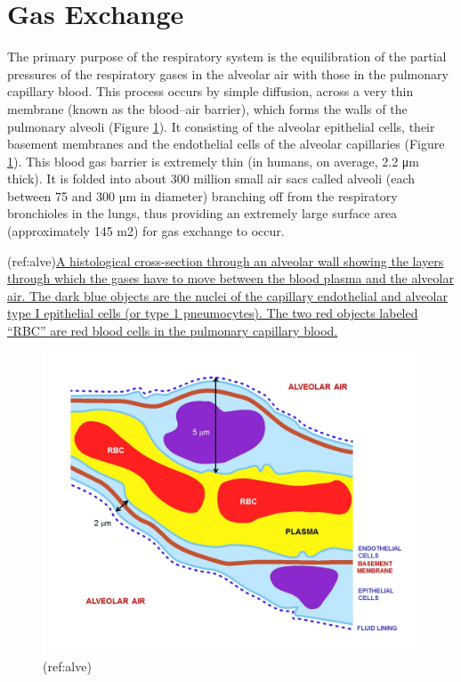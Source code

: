 \hypertarget{gas-exchange}{%
\section{Gas Exchange}\label{gas-exchange}}

The primary purpose of the respiratory system is the equilibration of the partial pressures of the respiratory gases in the alveolar air with those in the pulmonary capillary blood. This process occurs by simple diffusion, across a very thin membrane (known as the blood--air barrier), which forms the walls of the pulmonary alveoli (Figure \ref{fig:alveolarwall}). It consisting of the alveolar epithelial cells, their basement membranes and the endothelial cells of the alveolar capillaries (Figure \ref{fig:alveolarwall}). This blood gas barrier is extremely thin (in humans, on average, 2.2 μm thick). It is folded into about 300 million small air sacs called alveoli (each between 75 and 300 µm in diameter) branching off from the respiratory bronchioles in the lungs, thus providing an extremely large surface area (approximately 145 m2) for gas exchange to occur.

(ref:alve)\href{https://upload.wikimedia.org/wikipedia/commons/c/c8/Alveolar_wall.jpg}{A histological cross-section through an alveolar wall showing the layers through which the gases have to move between the blood plasma and the alveolar air. The dark blue objects are the nuclei of the capillary endothelial and alveolar type I epithelial cells (or type 1 pneumocytes). The two red objects labeled ``RBC'' are red blood cells in the pulmonary capillary blood.}

\begin{figure}

{\centering \includegraphics[width=0.7\linewidth]{./figures/respiratory/Alveolar_wall} 

}

\caption{(ref:alve)}\label{fig:alveolarwall}
\end{figure}

